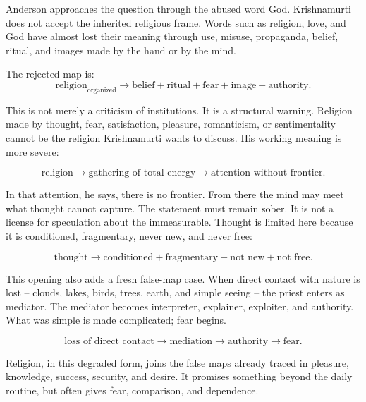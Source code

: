 \documentclass[11pt,oneside]{book}
\begin{document}
Anderson approaches the question through the abused word God. Krishnamurti does not accept the inherited religious frame. Words such as religion, love, and God have almost lost their meaning through use, misuse, propaganda, belief, ritual, and images made by the hand or by the mind.

The rejected map is:
\begin{equation}
\text{religion}_{\mathrm{organized}}
\longrightarrow
\text{belief}+\text{ritual}+\text{fear}+\text{image}+\text{authority}.
\end{equation}

This is not merely a criticism of institutions. It is a structural warning. Religion made by thought, fear, satisfaction, pleasure, romanticism, or sentimentality cannot be the religion Krishnamurti wants to discuss. His working meaning is more severe:

\begin{equation}
\text{religion}
\longrightarrow
\text{gathering of total energy}
\longrightarrow
\text{attention without frontier}.
\end{equation}

In that attention, he says, there is no frontier. From there the mind may meet what thought cannot capture. The statement must remain sober. It is not a license for speculation about the immeasurable. Thought is limited here because it is conditioned, fragmentary, never new, and never free:

\begin{equation}
\text{thought}
\longrightarrow
\text{conditioned}+\text{fragmentary}+\text{not new}+\text{not free}.
\end{equation}

This opening also adds a fresh false-map case. When direct contact with nature is lost -- clouds, lakes, birds, trees, earth, and simple seeing -- the priest enters as mediator. The mediator becomes interpreter, explainer, exploiter, and authority. What was simple is made complicated; fear begins.

\begin{equation}
\text{loss of direct contact}
\longrightarrow
\text{mediation}
\longrightarrow
\text{authority}
\longrightarrow
\text{fear}.
\end{equation}

Religion, in this degraded form, joins the false maps already traced in pleasure, knowledge, success, security, and desire. It promises something beyond the daily routine, but often gives fear, comparison, and dependence.
\end{document}
